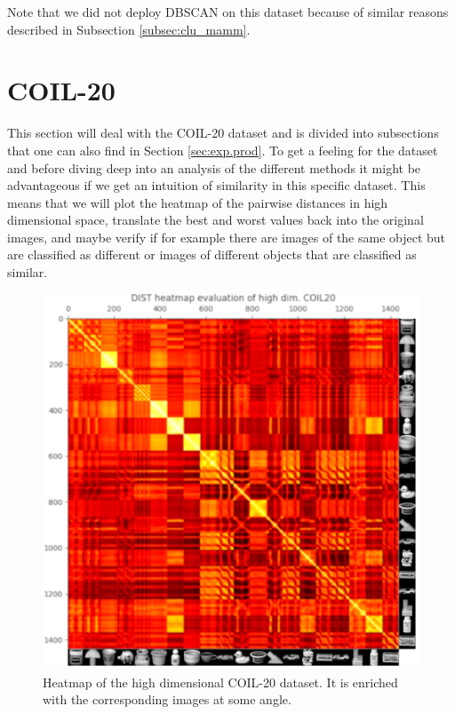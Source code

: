 Note that we did not deploy DBSCAN on this dataset because of similar reasons described in Subsection \ref{subsec:clu_mamm}.

\newpage

\section{COIL-20}

This section will deal with the COIL-20 dataset and is divided into subsections that one can also find in Section \ref{sec:exp.prod}. To get a feeling for the dataset and before diving deep into an analysis of the different methods it might be advantageous if we get an intuition of similarity in this specific dataset. This means that we will plot the heatmap of the pairwise distances in high dimensional space, translate the best and worst values back into the original images, and maybe verify if for example there are images of the same object but are classified as different or images of different objects that are classified as similar.

\begin{figure}[!]
	\centering
	\includegraphics[width=1\columnwidth]{images/dist_heatmap_high_coil20.png}
	\caption[Heatmap of High COIL-20]{Heatmap of the high dimensional COIL-20 dataset. It is enriched with the corresponding images at some angle.}
    \label{fig:dist_heatmap_high_coil20}
\end{figure}

